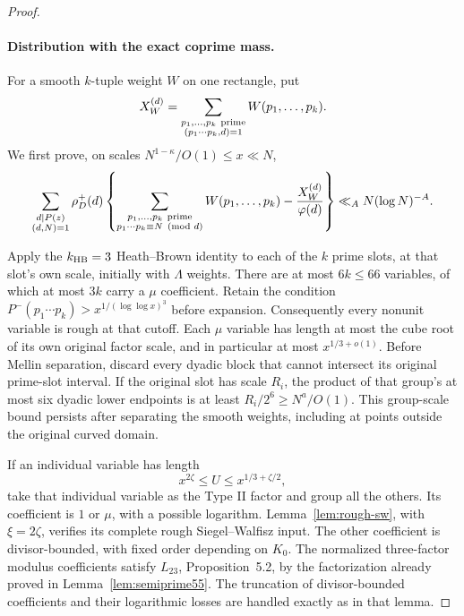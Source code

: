 \documentclass[11pt]{article}
\begin{document}
\begin{proof}
\paragraph{Distribution with the exact coprime mass.}
For a smooth $k$-tuple weight $W$ on one rectangle, put
\[
 X_W^{(d)}
   =\sum_{\substack{p_1,\ldots,p_k\ {\rm prime}\\
                    (p_1\cdots p_k,d)=1}}
                         W(p_1,\ldots,p_k).
\]
We first prove, on scales $N^{1-\kappa}/O(1)\le x\ll N$,
\begin{equation}\label{eq:primeproduct-coprime-error}
 \sum_{\substack{d\mid P(z)\\(d,N)=1}}\rho_D^+(d)
 \left\{
  \sum_{\substack{p_1,\ldots,p_k\ {\rm prime}\\
            p_1\cdots p_k\equiv N\pmod d}}W(p_1,\ldots,p_k)
       -\frac{X_W^{(d)}}{\varphi(d)}
 \right\}
 \ll_A N(\log N)^{-A}.
\end{equation}

Apply the $k_{\rm HB}=3$ Heath--Brown identity to each of the
$k$ prime slots, at that slot's own scale, initially with
$\Lambda$ weights. There are at most $6k\le66$ variables,
of which at most $3k$ carry a $\mu$ coefficient.
Retain the condition
$P^-(p_1\cdots p_k)>x^{1/(\log\log x)^3}$ before expansion.
Consequently every nonunit variable is rough at that cutoff.
Each $\mu$ variable has length at most the cube root of
its own original factor scale, and in particular at most
$x^{1/3+o(1)}$.
Before Mellin separation, discard every dyadic block that cannot
intersect its original prime-slot interval. If the original slot has
scale $R_i$, the product of that group's at most six dyadic lower
endpoints is at least $R_i/2^6\ge N^a/O(1)$. This group-scale bound
persists after separating the smooth weights, including at points
outside the original curved domain.

If an individual variable has length
\[
 x^{2\zeta}\le U\le x^{1/3+\zeta/2},
\]
take that individual variable as the Type II factor and group
all the others. Its coefficient is $1$ or $\mu$, with a possible
logarithm. Lemma~\ref{lem:rough-sw}, with $\xi=2\zeta$,
verifies its complete rough Siegel--Walfisz input.
The other coefficient is divisor-bounded, with fixed order
depending on $K_0$. The normalized three-factor modulus
coefficients satisfy $L_{23}$, Proposition~5.2, by the
factorization already proved in Lemma~\ref{lem:semiprime55}.
The truncation of divisor-bounded coefficients and their
logarithmic losses are handled exactly as in that lemma.


\end{proof}
\end{document}
